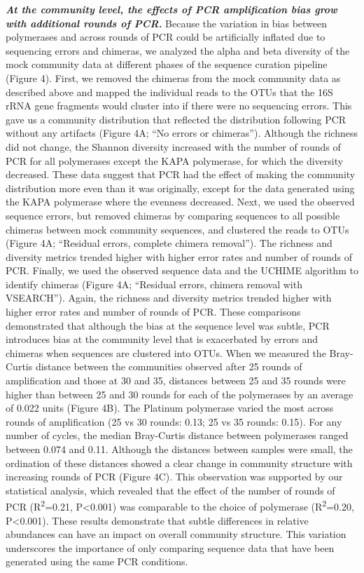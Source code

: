 \documentclass[11pt,]{article}
\begin{document}
\textbf{\emph{At the community level, the effects of PCR amplification
bias grow with additional rounds of PCR.}} Because the variation in bias
between polymerases and across rounds of PCR could be artificially
inflated due to sequencing errors and chimeras, we analyzed the alpha
and beta diversity of the mock community data at different phases of the
sequence curation pipeline (Figure 4). First, we removed the chimeras
from the mock community data as described above and mapped the
individual reads to the OTUs that the 16S rRNA gene fragments would
cluster into if there were no sequencing errors. This gave us a
community distribution that reflected the distribution following PCR
without any artifacts (Figure 4A; ``No errors or chimeras''). Although
the richness did not change, the Shannon diversity increased with the
number of rounds of PCR for all polymerases except the KAPA polymerase,
for which the diversity decreased. These data suggest that PCR had the
effect of making the community distribution more even than it was
originally, except for the data generated using the KAPA polymerase
where the evenness decreased. Next, we used the observed sequence
errors, but removed chimeras by comparing sequences to all possible
chimeras between mock community sequences, and clustered the reads to
OTUs (Figure 4A; ``Residual errors, complete chimera removal''). The
richness and diversity metrics trended higher with higher error rates
and number of rounds of PCR. Finally, we used the observed sequence data
and the UCHIME algorithm to identify chimeras (Figure 4A; ``Residual
errors, chimera removal with VSEARCH''). Again, the richness and
diversity metrics trended higher with higher error rates and number of
rounds of PCR. These comparisons demonstrated that although the bias at
the sequence level was subtle, PCR introduces bias at the community
level that is exacerbated by errors and chimeras when sequences are
clustered into OTUs. When we measured the Bray-Curtis distance between
the communities observed after 25 rounds of amplification and those at
30 and 35, distances between 25 and 35 rounds were higher than between
25 and 30 rounds for each of the polymerases by an average of 0.022
units (Figure 4B). The Platinum polymerase varied the most across rounds
of amplification (25 vs 30 rounds: 0.13; 25 vs 35 rounds: 0.15). For any
number of cycles, the median Bray-Curtis distance between polymerases
ranged between 0.074 and 0.11. Although the distances between samples
were small, the ordination of these distances showed a clear change in
community structure with increasing rounds of PCR (Figure 4C). This
observation was supported by our statistical analysis, which revealed
that the effect of the number of rounds of PCR
(R\textsuperscript{2}=0.21, P\textless{}0.001) was comparable to the
choice of polymerase (R\textsuperscript{2}=0.20, P\textless{}0.001).
These results demonstrate that subtle differences in relative abundances
can have an impact on overall community structure. This variation
underscores the importance of only comparing sequence data that have
been generated using the same PCR conditions.
\end{document}
